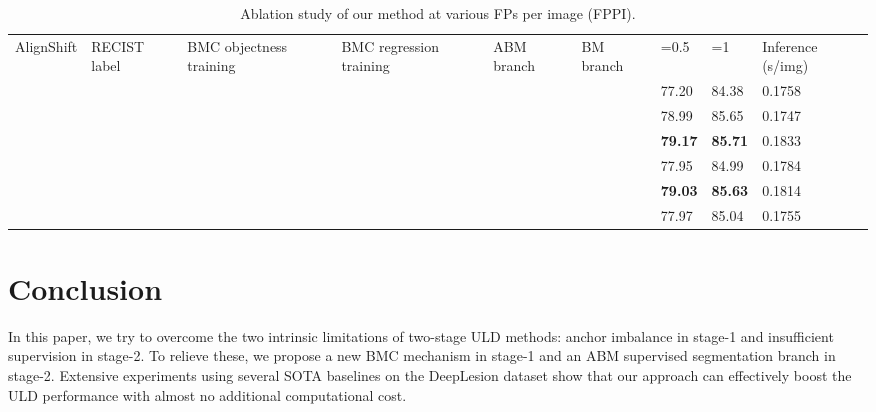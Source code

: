 \documentclass[runningheads]{llncs}
\begin{document}
\begin{table}[t]
\centering
\caption{Ablation study of our method at various FPs per image (FPPI).} \label{ablation_study}
\begin{lrbox}{\tablebox}

\begin{tabular}{p{20mm}<{\centering}p{25mm}<{\centering}p{25mm}<{\centering}p{25mm}<{\centering}p{18
mm}<{\centering}p{18mm}<{\centering}|p{18mm}<{\centering}p{18mm}<{\centering}|p{25mm}<{\centering}}
\toprule
AlignShift \cite{yang2020alignshift}&RECIST label&BMC objectness training &BMC regression training&ABM branch&BM branch \cite{li2020bounding} &=0.5&=1&Inference (s/img)\\
&&&&&&77.20&84.38&0.1758\\
&&&&&&78.99&85.65&0.1747\\
&&&&&&\textbf{79.17}&\textbf{85.71}&0.1833\\
\midrule
&&&&&&77.95&84.99&0.1784\\
&&&&&&\textbf{79.03}&\textbf{85.63}&0.1814\\
&&&&&&77.97&85.04&0.1755\\
\bottomrule
\end{tabular}

\end{lrbox}
\scalebox{0.5}{\usebox{\tablebox}}
\end{table}

\section{Conclusion}
In this paper, we try to overcome the two intrinsic limitations of two-stage ULD methods: anchor imbalance in stage-1 and insufficient supervision in stage-2. To relieve these, we propose a new BMC mechanism in stage-1 and an ABM supervised segmentation branch in stage-2.
Extensive experiments using several SOTA baselines on the DeepLesion dataset show that our approach can effectively boost the ULD performance with almost no additional computational cost.











\newpage


\end{document}
